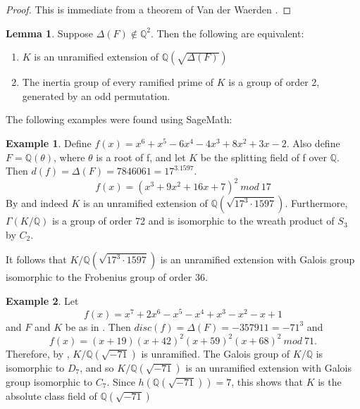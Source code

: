\documentclass[12pt]{extarticle}
\newcommand{\Q}{\mathbb{Q}}
\newcommand{\<}{\langle}
\renewcommand{\>}{\rangle}
\theoremstyle{definition}
\newtheorem{example}{Example}
\newtheorem{lemma}{Lemma}
\begin{document}
\begin{proof}
This is immediate from a theorem of Van der Waerden \cite{WAER}. 
\end{proof}
\begin{lemma}
\label{lem_tfae}
Suppose $\Delta(F)\notin \Q^2$. Then the following are equivalent:\begin{enumerate}
    \item $K$ is an unramified extension of $\Q(\sqrt{\Delta(F)})$
    \item The inertia group of every ramified prime of $K$ is a group of order 2, generated by an odd permutation. 
\end{enumerate}
\end{lemma} 
The following examples were found using SageMath:
\begin{example}
Define $f(x)=x^6 + x^5 - 6x^4 - 4x^3 + 8x^2 + 3x - 2$. Also define $F=\Q(\theta)$, where $\theta$ is a root of f, and let $K$ be the splitting field of f over $\Q$. Then $d(f)=\Delta(F)=7846061=17^3.1597$. 
\begin{equation}
   f(x)= (x^3 + 9x^2 + 16x + 7)^2\:mod\:17
\end{equation}
By  and  indeed $K$ is an unramified extension of $\Q(\sqrt{17^3 \cdot 1597})$. Furthermore, $\Gamma(K/\Q)$ is a group of order 72 and is isomorphic to the wreath product of $S_3$ by $C_2$. \par 
It follows that $K/\Q(\sqrt{17^3 \cdot 1597})$ is an unramified extension with Galois group isomorphic to the Frobenius group of order 36.
\end{example}
\begin{example}
\label{ex:frob}
 Let \begin{equation}
     f(x)=x^7 + 2x^6 - x^5 - x^4 + x^3 - x^2 - x + 1
 \end{equation}and $F$ and $K$ be as in .
Then $disc(f)=\Delta(F)=-357911=-71^{3}$ and
\begin{equation}
    f(x)=(x + 19)(x + 42)^2 (x + 59)^2(x + 68)^2\:mod\:71.
\end{equation}
Therefore, by , $K/\Q(\sqrt{-71})$ is unramified. The Galois group of $K/\Q$
is isomorphic to $D_{7}$, and so $K/\Q(\sqrt{-71})$
is an unramified extension with Galois group isomorphic to $C_7$.
Since $h(\Q(\sqrt{-71}))=7$, this shows that $K$ is the absolute class field of $\Q(\sqrt{-71})$
\end{example}
\end{document}
